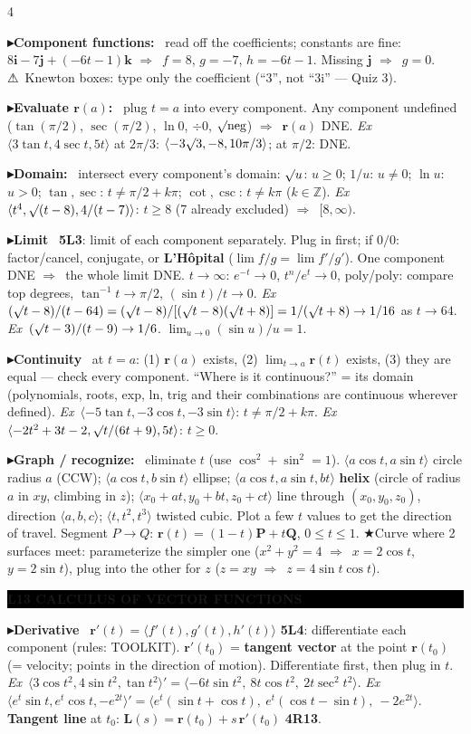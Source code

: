 \documentclass{article}
\newcommand\vb[1]{\symbf{#1}}                 %
\newcommand\ip[1]{\langle #1\rangle}          %
\newcommand\sh[1]{{\setlength\fboxsep{0.18pt}\colorbox{black!22}{\textbf{#1}}}} %
\newcommand\hd[1]{\par\vspace{0.5pt}\needspace{4\baselineskip}\noindent
  {\setlength\fboxsep{0.45pt}\colorbox{black}{\parbox{\dimexpr\linewidth-2\fboxsep}{\color{white}\bfseries #1}}}\par\nobreak\vspace{0.2pt}\nobreak}
\newcommand\pt[1]{\par\textbf{{\symf ▸}#1}\ }  %
\newcommand\ex{\textit{Ex}\ }                  %
\newcommand\warn{{\symf ⚠}}                    %
\newcommand\shc{{\symf ★}}                      %
\newcommand\rt{\smash{\surd}}               %
\newcommand\then{\ensuremath{\Rightarrow}}
\begin{document}
\begin{multicols*}{4}
\pt{Component functions:} read off the coefficients; constants are fine: $8\vb i-7\vb j+(-6t-1)\vb k$ \then\ $f=8$, $g=-7$, $h=-6t-1$. Missing $\vb j$ \then\ $g=0$. \warn\ Knewton boxes: type only the coefficient (``3'', not ``3i'' — Quiz 3).

\pt{Evaluate $\vb r(a)$:} plug $t=a$ into every component. Any component undefined ($\tan(\pi/2)$, $\sec(\pi/2)$, $\ln0$, $\div0$, $\rt\text{neg}$) \then\ $\vb r(a)$ DNE. \ex $\ip{3\tan t,4\sec t,5t}$ at $2\pi/3$: $\ip{-3\rt3,-8,10\pi/3}$; at $\pi/2$: DNE.

\pt{Domain:} intersect every component's domain: $\rt u$: $u\ge0$; $1/u$: $u\ne0$; $\ln u$: $u>0$; $\tan,\sec$: $t\ne\pi/2+k\pi$; $\cot,\csc$: $t\ne k\pi$ ($k\in\mathbb Z$). \ex $\ip{t^4,\rt(t-8),4/(t-7)}$: $t\ge8$ (7 already excluded) \then\ $[8,\infty)$.

\pt{Limit} \sh{5L3}: limit of each component separately. Plug in first; if $0/0$: factor/cancel, conjugate, or \textbf{L'Hôpital} ($\lim f/g=\lim f'/g'$). One component DNE \then\ the whole limit DNE. $t\to\infty$: $e^{-t}\to0$, $t^n/e^t\to0$, poly/poly: compare top degrees, $\tan^{-1}t\to\pi/2$, $(\sin t)/t\to0$. \ex $(\rt t-8)/(t-64)=(\rt t-8)/[(\rt t-8)(\rt t+8)]=1/(\rt t+8)\to1/16$ as $t\to64$. \ex $(\rt t-3)/(t-9)\to1/6$. $\lim_{u\to0}(\sin u)/u=1$.

\pt{Continuity} at $t=a$: (1) $\vb r(a)$ exists, (2) $\lim_{t\to a}\vb r(t)$ exists, (3) they are equal — check every component. ``Where is it continuous?'' = its domain (polynomials, roots, exp, ln, trig and their combinations are continuous wherever defined). \ex $\ip{-5\tan t,-3\cos t,-3\sin t}$: $t\ne\pi/2+k\pi$. \ex $\ip{-2t^2+3t-2,\rt t/(6t+9),5t}$: $t\ge0$.

\pt{Graph / recognize:} eliminate $t$ (use $\cos^2+\sin^2=1$). $\ip{a\cos t,a\sin t}$ circle radius $a$ (CCW); $\ip{a\cos t,b\sin t}$ ellipse; $\ip{a\cos t,a\sin t,bt}$ \textbf{helix} (circle of radius $a$ in $xy$, climbing in $z$); $\ip{x_0+at,y_0+bt,z_0+ct}$ line through $(x_0,y_0,z_0)$, direction $\ip{a,b,c}$; $\ip{t,t^2,t^3}$ twisted cubic. Plot a few $t$ values to get the direction of travel. Segment $P\to Q$: $\vb r(t)=(1-t)\vb P+t\vb Q$, $0\le t\le1$. \shc Curve where 2 surfaces meet: parameterize the simpler one ($x^2+y^2=4$ \then\ $x=2\cos t$, $y=2\sin t$), plug into the other for $z$ ($z=xy$ \then\ $z=4\sin t\cos t$).

\hd{L13 CALCULUS OF VECTOR FUNCTIONS}
\pt{Derivative} $\vb r'(t)=\ip{f'(t),g'(t),h'(t)}$ \sh{5L4}: differentiate each component (rules: TOOLKIT). $\vb r'(t_0)$ = \textbf{tangent vector} at the point $\vb r(t_0)$ (= velocity; points in the direction of motion). Differentiate first, then plug in $t$. \ex $\ip{3\cos t^2,4\sin t^2,\tan t^2}'=\ip{-6t\sin t^2,\ 8t\cos t^2,\ 2t\sec^2t^2}$. \ex $\ip{e^t\sin t,e^t\cos t,-e^{2t}}'=\ip{e^t(\sin t+\cos t),\ e^t(\cos t-\sin t),\ -2e^{2t}}$. \textbf{Tangent line} at $t_0$: $\vb L(s)=\vb r(t_0)+s\,\vb r'(t_0)$ \sh{4R13}.


\end{multicols*}
\end{document}
